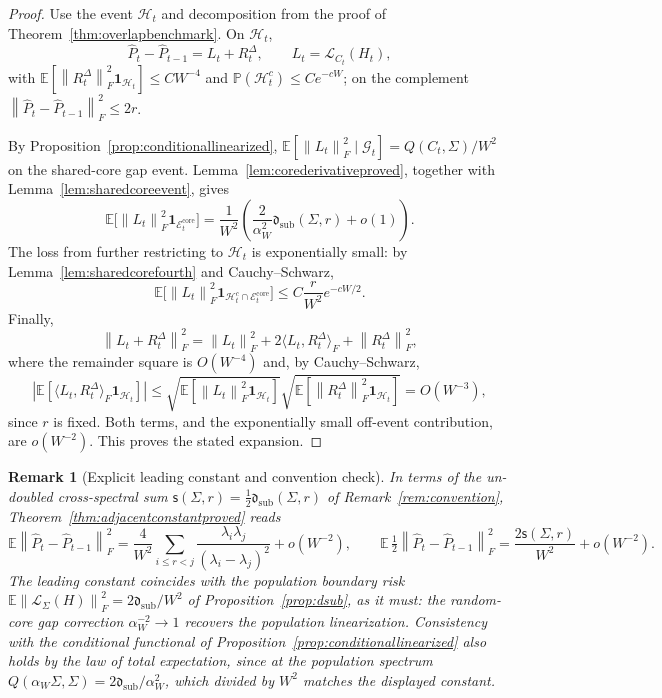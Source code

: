 \documentclass[11pt]{article}
\theoremstyle{tightplain}
\theoremstyle{tightdef}
\newtheorem{remark}[theorem]{Remark}
\newcommand{\E}{\mathbb E}
\newcommand{\Prob}{\mathbb P}
\newcommand{\norm}[1]{\left\lVert #1 \right\rVert}
\newcommand{\abs}[1]{\left\lvert #1 \right\rvert}
\newcommand{\one}{\mathbf 1}
\newcommand{\ssum}{\mathsf s}
\begin{document}
\begin{proof}
Use the event $\mathcal H_t$ and decomposition from the proof of
Theorem~\ref{thm:overlapbenchmark}. On $\mathcal H_t$,
\[
\widehat P_t-\widehat P_{t-1}
=
L_t+R_t^\Delta,
\qquad
L_t=\mathcal L_{C_t}(H_t),
\]
with $\E[\norm{R_t^\Delta}_F^2\one_{\mathcal H_t}]\le C W^{-4}$ and
$\Prob(\mathcal H_t^c)\le Ce^{-cW}$; on the complement
$\norm{\widehat P_t-\widehat P_{t-1}}_F^2\le 2r$.

By Proposition~\ref{prop:conditionallinearized},
$\E[\norm{L_t}_F^2\mid\mathcal G_t]=Q(C_t,\Sigma)/W^2$ on the shared-core gap
event. Lemma~\ref{lem:corederivativeproved}, together with
Lemma~\ref{lem:sharedcoreevent}, gives
\[
\E\bigl[\norm{L_t}_F^2\one_{\mathcal E_t^{\mathrm{core}}}\bigr]
=
\frac{1}{W^2}
\left(
\frac{2}{\alpha_W^2}\mathfrak d_{\mathrm{sub}}(\Sigma,r)
+
o(1)
\right).
\]
The loss from further restricting to $\mathcal H_t$ is exponentially small: by
Lemma~\ref{lem:sharedcorefourth} and Cauchy--Schwarz,
\[
\E\bigl[\norm{L_t}_F^2\one_{\mathcal H_t^c\cap\mathcal E_t^{\mathrm{core}}}\bigr]
\le
C\frac r{W^2}e^{-cW/2}.
\]
Finally,
\[
\norm{L_t+R_t^\Delta}_F^2
=
\norm{L_t}_F^2
+
2\langle L_t,R_t^\Delta\rangle_F
+
\norm{R_t^\Delta}_F^2,
\]
where the remainder square is $O(W^{-4})$ and, by Cauchy--Schwarz,
\[
\abs{\E[\langle L_t,R_t^\Delta\rangle_F\one_{\mathcal H_t}]}
\le
\sqrt{\E[\norm{L_t}_F^2\one_{\mathcal H_t}]}
\sqrt{\E[\norm{R_t^\Delta}_F^2\one_{\mathcal H_t}]}
=
O(W^{-3}),
\]
since $r$ is fixed. Both terms, and the exponentially small off-event
contribution, are $o(W^{-2})$. This proves the stated expansion.
\end{proof}

\begin{remark}[Explicit leading constant and convention check]\label{rem:explicit}
In terms of the un-doubled cross-spectral sum
$\ssum(\Sigma,r)=\tfrac12\mathfrak d_{\mathrm{sub}}(\Sigma,r)$ of
Remark~\ref{rem:convention}, Theorem~\ref{thm:adjacentconstantproved} reads
\[
\E\norm{\widehat P_t-\widehat P_{t-1}}_F^2
=\frac{4}{W^2}\sum_{i\le r<j}\frac{\lambda_i\lambda_j}{(\lambda_i-\lambda_j)^2}
+o(W^{-2}),
\qquad
\E\,\tfrac12\norm{\widehat P_t-\widehat P_{t-1}}_F^2
=\frac{2\ssum(\Sigma,r)}{W^2}+o(W^{-2}).
\]
The leading constant coincides with the population boundary risk
$\E\norm{\mathcal L_\Sigma(H)}_F^2=2\mathfrak d_{\mathrm{sub}}/W^2$ of
Proposition~\ref{prop:dsub}, as it must: the random-core gap correction
$\alpha_W^{-2}\to1$ recovers the population linearization. Consistency with the
conditional functional of Proposition~\ref{prop:conditionallinearized} also
holds by the law of total expectation, since at the population spectrum
$Q(\alpha_W\Sigma,\Sigma)=2\mathfrak d_{\mathrm{sub}}/\alpha_W^2$, which divided
by $W^2$ matches the displayed constant.
\end{remark}
\end{document}
